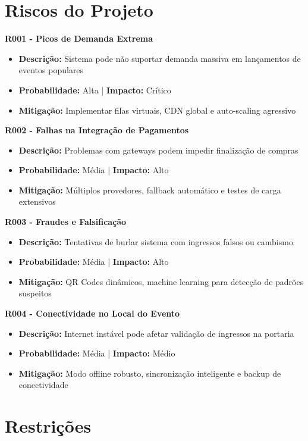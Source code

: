 \section{Riscos do Projeto}

\textbf{R001 - Picos de Demanda Extrema}
\begin{itemize}
    \item \textbf{Descrição:} Sistema pode não suportar demanda massiva em lançamentos de eventos populares
    \item \textbf{Probabilidade:} Alta | \textbf{Impacto:} Crítico
    \item \textbf{Mitigação:} Implementar filas virtuais, CDN global e auto-scaling agressivo
\end{itemize}

\textbf{R002 - Falhas na Integração de Pagamentos}
\begin{itemize}
    \item \textbf{Descrição:} Problemas com gateways podem impedir finalização de compras
    \item \textbf{Probabilidade:} Média | \textbf{Impacto:} Alto
    \item \textbf{Mitigação:} Múltiplos provedores, fallback automático e testes de carga extensivos
\end{itemize}

\textbf{R003 - Fraudes e Falsificação}
\begin{itemize}
    \item \textbf{Descrição:} Tentativas de burlar sistema com ingressos falsos ou cambismo
    \item \textbf{Probabilidade:} Média | \textbf{Impacto:} Alto
    \item \textbf{Mitigação:} QR Codes dinâmicos, machine learning para detecção de padrões suspeitos
\end{itemize}

\textbf{R004 - Conectividade no Local do Evento}
\begin{itemize}
    \item \textbf{Descrição:} Internet instável pode afetar validação de ingressos na portaria
    \item \textbf{Probabilidade:} Média | \textbf{Impacto:} Médio
    \item \textbf{Mitigação:} Modo offline robusto, sincronização inteligente e backup de conectividade
\end{itemize}

\section{Restrições}

